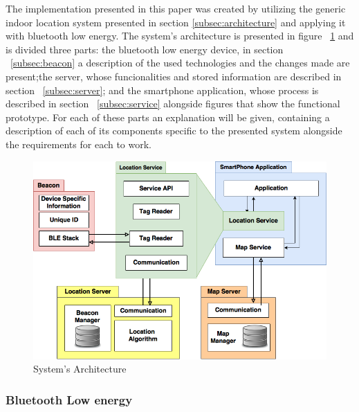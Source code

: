 \documentclass[a4paper]{IEEEtran}
\begin{document}
The implementation presented in this paper was created by utilizing the generic indoor location system presented in section \ref{subsec:architecture} and applying it with bluetooth low energy. The system's architecture is presented in figure ~\ref{fig:implementation} and is divided three parts: the bluetooth low energy device, in section ~\ref{subsec:beacon} a description of the used technologies and the changes made are present;the server, whose funcionalities and stored information are described in section ~\ref{subsec:server}; and the smartphone application, whose process is described in section ~\ref{subsec:service} alongside figures that show the functional prototype. For each of these parts an explanation will be given, containing a description of each of its components specific to the presented system alongside the requirements for each to work.

\begin{figure}
	\centering
		\includegraphics[width=1\linewidth]{figures/implementation.png}
	\caption[System's Architecture]{System's Architecture}
	\label{fig:implementation}
\end{figure}

\subsubsection{Bluetooth Low energy}
\label{subsec:ble}
\end{document}

